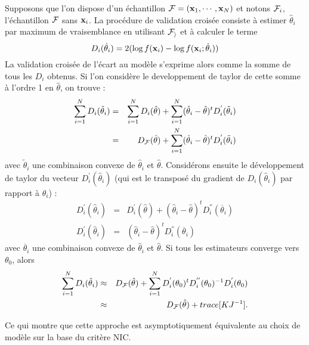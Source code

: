 Supposons que l'on dispose d'un \'echantillon ${\cal F}=(\mbox{\bf x}_1,\cdots,\mbox{\bf x}_N)$ et
notons ${\cal F}_i$, l'\'echantillon ${\cal F}$ sans $\mbox{\bf x}_i$. La proc\'edure
de validation crois\'ee consiste \`a estimer  $\hat{\theta}_i$ par 
maximum de vraisemblance en utilisant ${\cal F_i}$ et \`a calculer le terme 
$$
D_i(\hat{\theta}_i)=2( \log f(\mbox{\bf x}_i) - \log f(\mbox{\bf x}_i ; \hat{\theta}_i) )
$$
La validation crois\'ee de l'\'ecart au mod\`ele s'exprime alors comme
la somme de tous les $D_i$ obtenus. Si l'on consid\`ere le 
developpement de taylor de cette somme \`a l'ordre 1 en $\hat{\theta}$, 
on trouve :
\begin{eqnarray*}
 \sum_{i=1}^{N} D_i(\hat{\theta}_i)  & = &\sum_{i=1}^{N} D_i(\hat{\theta}) +  \sum_{i=1}^{N} ( \hat{\theta}_i- \hat{\theta})^t D_i^{'}(\tilde{\theta}_i) \\
          & = & D_{\cal F}(\hat{\theta}) +   \sum_{i=1}^{N} ( \hat{\theta}_i- \hat{\theta})^t D_i^{'}(\tilde{\theta}_i)
\end{eqnarray*}
avec $\tilde{\theta}_i$ une combinaison convexe de $\hat{\theta}_i$ et 
$\hat{\theta}$. Consid\'erons ensuite le d\'eveloppement de taylor
du vecteur $D_i^{'}(\hat{\theta}_i)$ (qui est le transpos\'e du gradient de
$D_i(\hat{\theta}_i)$ par rapport \`a $\hat{\theta}_i$) : 
\begin{eqnarray*}
D_i^{'}(\hat{\theta}_i)  & = &  D_i^{'}(\hat{\theta}) +  ( \hat{\theta}_i- \hat{\theta})^t D_i^{''}(\overline{\theta}_i) \\
D_i^{'}(\hat{\theta}_i)  & = &   ( \hat{\theta}_i- \hat{\theta})^t D_i^{''}(\overline{\theta}_i) 
\end{eqnarray*}
avec $\overline{\theta}_i$ une combinaison convexe de $\hat{\theta}_i$ et 
$\hat{\theta}$. Si tous les estimateurs converge vers $\theta_0$, alors
\begin{eqnarray*}
\sum_{i=1}^{N} D_i(\hat{\theta}_i)  & \approx  & D_{\cal F}(\hat{\theta}) +   
\sum_{i=1}^{N} D_i^{'}(\theta_0)^t D_i^{''}(\theta_0)^{-1}
 D_i^{'}(\theta_0) \\
  & \approx  & D_{\cal F}(\hat{\theta}) + trace [KJ^{-1}].
\end{eqnarray*}

Ce qui montre que cette approche est asymptotiquement \'equivalente au choix de mod\`ele 
sur la base du crit\`ere NIC.

